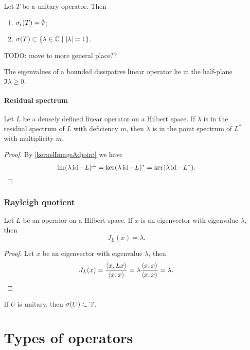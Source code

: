 \begin{proposition}
Let $T$ be a unitary operator. Then
\begin{enumerate}
\item $\sigma_\text{r}(T) = \emptyset$;
\item $\sigma(T) \subset \left\{ \lambda\in\mathbb{C} \;\middle|\; |\lambda| = 1 \right\}$.
\end{enumerate}
\end{proposition}
TODO: move to more general place??

\begin{lemma}
The eigenvalues of a bounded dissipative linear operator
lie in the half-plane $\Im\lambda \geq 0$.
\end{lemma}


\subsubsection{Residual spectrum}
\begin{proposition}
Let $L$ be a densely defined linear operator on a Hilbert space. If $\lambda$ is in the residual spectrum of $L$ with deficiency $m$, then $\overline{\lambda}$ is in the point spectrum of $L^*$ with multiplicity $m$.
\end{proposition}
\begin{proof}
By \ref{kernelImageAdjoint} we have
\[ \operatorname{im}(\lambda \operatorname{id} - L)^\perp = \ker(\lambda\operatorname{id} - L)^* = \ker(\overline{\lambda}\operatorname{id} - L^*). \]
\end{proof}

\subsection{Rayleigh quotient}
\begin{lemma}
Let $L$ be an operator on a Hilbert space. If $x$ is an eigenvector with eigenvalue $\lambda$, then
\[ J_L(x) = \lambda. \]
\end{lemma}
\begin{proof}
Let $x$ be an eigenvector with eigenvalue $\lambda$, then
\[ J_L(x) = \frac{\left\langle x,Lx \right\rangle}{\left\langle x,x \right\rangle} = \lambda \frac{\left\langle x,x \right\rangle}{\left\langle x,x \right\rangle} = \lambda. \]
\end{proof}

\begin{proposition}
If $U$ is unitary, then $\sigma(U)\subset \mathbb{T}$.
\end{proposition}

\chapter{Types of operators}
